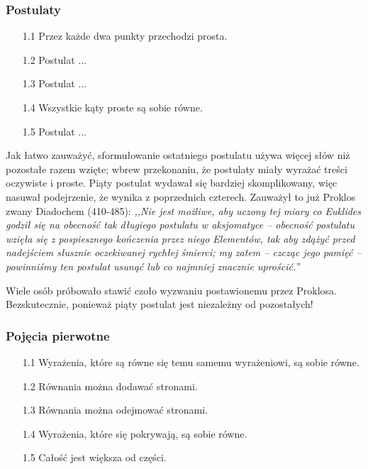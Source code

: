 \subsubsection{Postulaty}	
\begin{enumerate}	
    \item [1.1] Przez każde dwa punkty przechodzi prosta.
    \item [1.2] Postulat ... %
    \item [1.3] Postulat ... %
    \item [1.4] Wszystkie kąty proste są sobie równe.
    \item [1.5] Postulat ... %
\end{enumerate}	
	
Jak łatwo zauważyć, sformułowanie ostatniego postulatu używa więcej słów niż pozostałe razem wzięte; wbrew przekonaniu, że postulaty miały wyrażać treści oczywiste i proste.	
Piąty postulat wydawał się bardziej skomplikowany, więc nasuwał podejrzenie, że wynika z poprzednich czterech.	
Zauważył to już Proklos zwany Diadochem (410-485):
%
\emph{,,Nie jest możliwe, aby uczony tej miary co Euklides godził się na obecność tak długiego postulatu w aksjomatyce -- obecność postulatu wzięła się z pospiesznego kończenia przez niego Elementów, tak aby zdążyć przed nadejściem słusznie oczekiwanej rychłej śmierci; my zatem -- czcząc jego pamięć -- powinniśmy ten postulat usunąć lub co najmniej znacznie uprościć.''}	
	
Wiele osób próbowało stawić czoło wyzwaniu postawionemu przez Proklosa.	
Bezskutecznie, ponieważ piąty postulat jest niezależny od pozostałych!

\subsubsection{Pojęcia pierwotne}	
\begin{enumerate}	
    \item [1.1] Wyrażenia, które są równe się temu samemu wyrażeniowi, są sobie równe.
    \item [1.2] Równania można dodawać stronami.
    \item [1.3] Równania można odejmować stronami.
    \item [1.4] Wyrażenia, które się pokrywają, są sobie równe.
    \item [1.5] Całość jest większa od części.
\end{enumerate}	
	
